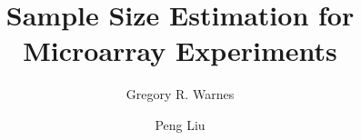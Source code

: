 \documentclass[12pt]{article}
\begin{document}
\doublespace

\title{Sample Size Estimation for Microarray Experiments}
\author{Gregory R. Warnes}
\address{
    Nonclinical Statistics \\
    Pfizer Global Research and Development\\
    Groton, CT 06340
}


\author{Peng Liu}
\address{
  Department of Biological Statistics and Computational Biology\\
  Cornell University\\
  Ithaca, NY 14853
  }

\maketitle
\end{document}
